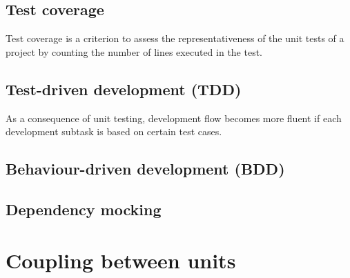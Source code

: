 \documentclass{article}
\begin{document}
\subsection{Test coverage}
Test coverage is a criterion to assess the representativeness of the unit tests of a project by counting the number of lines executed in the test.


\subsection{Test-driven development (TDD)}
As a consequence of unit testing, development flow becomes more fluent if each development subtask is based on certain test cases.

\subsection{Behaviour-driven development (BDD)}


\subsection{Dependency mocking}

\section{Coupling between units}
\end{document}
